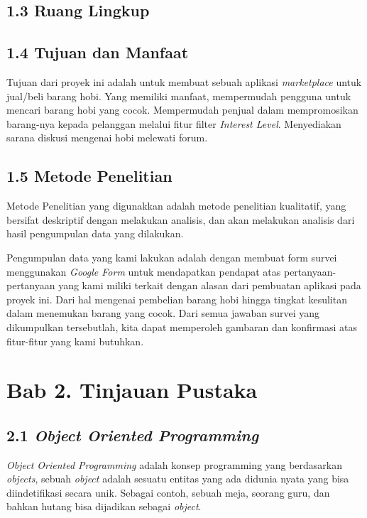 \documentclass[a4paper]{article}
\begin{document}
\subsection*{1.3 Ruang Lingkup}

\subsection*{1.4 Tujuan dan Manfaat}

Tujuan dari proyek ini adalah untuk membuat sebuah aplikasi \textit{marketplace} untuk jual/beli barang hobi. Yang memiliki manfaat, mempermudah pengguna untuk mencari barang hobi yang cocok. Mempermudah penjual dalam mempromosikan barang-nya kepada pelanggan melalui fitur filter \textit{Interest Level}. Menyediakan sarana diskusi mengenai hobi melewati forum.

\subsection*{1.5 Metode Penelitian}

Metode Penelitian yang digunakkan adalah metode penelitian kualitatif, yang bersifat deskriptif dengan melakukan analisis\autocite{pengajar-kualitatif}, dan akan melakukan analisis dari hasil pengumpulan data yang dilakukan.


Pengumpulan data yang kami lakukan adalah dengan membuat form survei menggunakan \textit{Google Form} untuk mendapatkan pendapat atas pertanyaan-pertanyaan yang kami miliki terkait dengan alasan dari pembuatan aplikasi pada proyek ini. Dari hal mengenai pembelian barang hobi hingga tingkat kesulitan dalam menemukan barang yang cocok. Dari semua jawaban survei yang dikumpulkan tersebutlah, kita dapat memperoleh gambaran dan konfirmasi atas fitur-fitur yang kami butuhkan.

\newpage
\section*{Bab 2. Tinjauan Pustaka}


\subsection*{2.1 \textit{Object Oriented Programming}}
\textit{Object Oriented Programming} adalah konsep programming yang berdasarkan \textit{objects}, sebuah \textit{object} adalah sesuatu entitas yang ada didunia nyata yang bisa diindetifikasi secara unik\autocite{liang_liang_2021}. Sebagai contoh, sebuah meja, seorang guru, dan bahkan hutang bisa dijadikan sebagai \textit{object}. 
\end{document}
